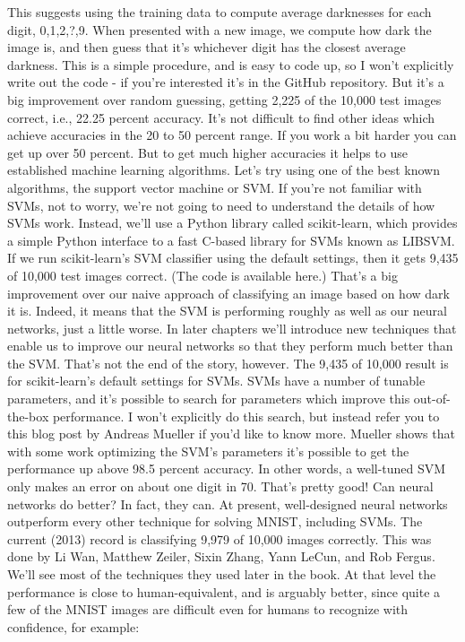 This suggests using the training data to compute average darknesses for each digit, 0,1,2,?,9. When presented with a new image, we compute how dark the image is, and then guess that it's whichever digit has the closest average darkness. This is a simple procedure, and is easy to code up, so I won't explicitly write out the code - if you're interested it's in the GitHub repository. But it's a big improvement over random guessing, getting 2,225 of the 10,000 test images correct, i.e., 22.25 percent accuracy.
It's not difficult to find other ideas which achieve accuracies in the 20 to 50 percent range. If you work a bit harder you can get up over 50 percent. But to get much higher accuracies it helps to use established machine learning algorithms. Let's try using one of the best known algorithms, the support vector machine or SVM. If you're not familiar with SVMs, not to worry, we're not going to need to understand the details of how SVMs work. Instead, we'll use a Python library called scikit-learn, which provides a simple Python interface to a fast C-based library for SVMs known as LIBSVM.
If we run scikit-learn's SVM classifier using the default settings, then it gets 9,435 of 10,000 test images correct. (The code is available here.) That's a big improvement over our naive approach of classifying an image based on how dark it is. Indeed, it means that the SVM is performing roughly as well as our neural networks, just a little worse. In later chapters we'll introduce new techniques that enable us to improve our neural networks so that they perform much better than the SVM.
That's not the end of the story, however. The 9,435 of 10,000 result is for scikit-learn's default settings for SVMs. SVMs have a number of tunable parameters, and it's possible to search for parameters which improve this out-of-the-box performance. I won't explicitly do this search, but instead refer you to this blog post by Andreas Mueller if you'd like to know more. Mueller shows that with some work optimizing the SVM's parameters it's possible to get the performance up above 98.5 percent accuracy. In other words, a well-tuned SVM only makes an error on about one digit in 70. That's pretty good! Can neural networks do better?
In fact, they can. At present, well-designed neural networks outperform every other technique for solving MNIST, including SVMs. The current (2013) record is classifying 9,979 of 10,000 images correctly. This was done by Li Wan, Matthew Zeiler, Sixin Zhang, Yann LeCun, and Rob Fergus. We'll see most of the techniques they used later in the book. At that level the performance is close to human-equivalent, and is arguably better, since quite a few of the MNIST images are difficult even for humans to recognize with confidence, for example:


